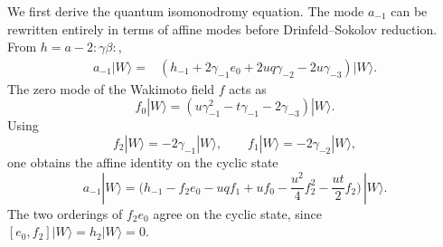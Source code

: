 \documentclass[a4paper,11pt]{article}
\numberwithin{equation}{section}
\begin{document}
We first derive the quantum isomonodromy equation.  The mode $a_{-1}$ can be rewritten entirely in terms of affine
modes before Drinfeld--Sokolov reduction.  From $h=a-2:\gamma\beta:$,
\begin{equation}
	\begin{aligned}
		a_{-1}|W\rangle
		={}&
		\left(
		h_{-1}
		+2\gamma_{-1}e_{0}
		+2uq\gamma_{-2}
		-2u\gamma_{-3}
		\right)|W\rangle.
	\end{aligned}
\end{equation}
The zero mode of the Wakimoto field $f$ acts as
\begin{equation}
f_{0}|W\rangle
	=
	\left(
	u\gamma_{-1}^{2}
	-t\gamma_{-1}
	-2\gamma_{-3}
	\right)|W\rangle.
\end{equation}
Using
\begin{equation}
	f_{2}|W\rangle=-2\gamma_{-1}|W\rangle,
	\qquad
	f_{1}|W\rangle=-2\gamma_{-2}|W\rangle,
\end{equation}
one obtains the affine identity on the cyclic state
\begin{equation}
	\label{equation:PII a minus one affine resolution}
		a_{-1}|W\rangle
		=
		\Bigg(
		h_{-1}
		-f_{2}e_{0}
		-uqf_{1}
		+uf_{0}
		-\frac{u^{2}}{4}f_{2}^{2}
		-\frac{ut}{2}f_{2}
		\Bigg)\,|W\rangle.
\end{equation}
The two orderings of $f_{2}e_{0}$ agree on the cyclic state, since
$[e_{0},f_{2}]|W\rangle=h_{2}|W\rangle=0$.
\end{document}
